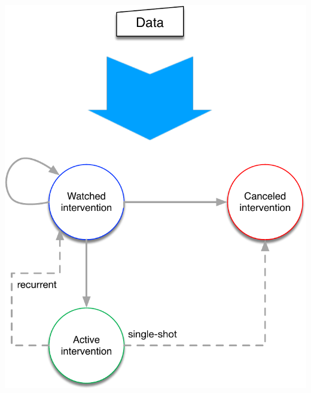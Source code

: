 %
\begin{marginfigure}
    \centering
    \includegraphics[width=\textwidth]{images/intervention_flow_chart_overview.pdf}
    \caption{%
        Intervention states and possible transitions. Based on specific events,
        the agent can start to watch a specific intervention at any moment.
        That intervention can either become active (delivered to particular
        team members) or canceled if it is no longer relevant. An active
        intervention can be watched again for possible reactivation (recurrent
        intervention), or it can be canceled if it needs to be delivered just a
        single time (single-shot intervention).
    }
    \label{fig:marker_block_intervention_flow_chart_general}
\end{marginfigure}

